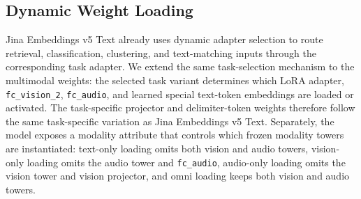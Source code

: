 \subsection{Dynamic Weight Loading}
\label{sec:method:dynamic-loading}

Jina Embeddings v5 Text already uses dynamic adapter selection to route retrieval, classification, clustering, and text-matching inputs through the corresponding task adapter.
We extend the same task-selection mechanism to the multimodal weights: the selected task variant determines which LoRA adapter, \texttt{fc\_vision\_2}, \texttt{fc\_audio}, and learned special text-token embeddings are loaded or activated.
The task-specific projector and delimiter-token weights therefore follow the same task-specific variation as Jina Embeddings v5 Text.
Separately, the model exposes a modality attribute that controls which frozen modality towers are instantiated: text-only loading omits both vision and audio towers, vision-only loading omits the audio tower and \texttt{fc\_audio}, audio-only loading omits the vision tower and vision projector, and omni loading keeps both vision and audio towers.
